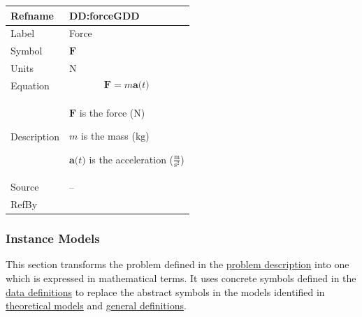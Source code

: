 \documentclass[12pt]{article}
\begin{document}
\begin{minipage}{\textwidth}
\begin{tabular}{>{\raggedright}p{}>{\raggedright\arraybackslash}p{}}
\toprule \textbf{Refname} & \textbf{DD:forceGDD}
\label{DD:forceGDD}
\\ \midrule
Label & Force
        
\\ \midrule
Symbol & $\symbf{F}$
         
\\ \midrule
Units & ${\text{N}}$
        
\\ \midrule
Equation & \begin{displaymath}
           \symbf{F}=m \symbf{a}\text{(}t\text{)}
           \end{displaymath}
\\ \midrule
Description & \begin{symbDescription}
              \item{$\symbf{F}$ is the force (${\text{N}}$)}
              \item{$m$ is the mass (${\text{kg}}$)}
              \item{$\symbf{a}\text{(}t\text{)}$ is the acceleration ($\frac{\text{m}}{\text{s}^{2}}$)}
              \end{symbDescription}
\\ \midrule
Source & --
         
\\ \midrule
RefBy & 
\\ \bottomrule
\end{tabular}
\end{minipage}
\subsubsection{Instance Models}
\label{Sec:IMs}
This section transforms the problem defined in the \hyperref[Sec:ProbDesc]{problem description} into one which is expressed in mathematical terms. It uses concrete symbols defined in the \hyperref[Sec:DDs]{data definitions} to replace the abstract symbols in the models identified in \hyperref[Sec:TMs]{theoretical models} and \hyperref[Sec:GDs]{general definitions}.
\end{document}
